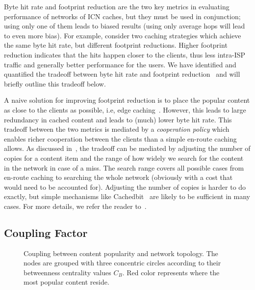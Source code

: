 \documentclass{sigcomm-alternate}
\begin{document}
Byte hit rate and footprint reduction are the two key metrics in evaluating performance of networks of ICN caches, but they must be used in conjunction; using only one of them leads to biased results (using only average hops will lead to even more bias).
For example, consider two caching strategies which achieve the same byte hit rate, but different footprint reductions.
Higher footprint reduction indicates that the hits happen closer to the clients, thus less intra-ISP traffic and generally better performance for the users.
We have identified and quantified the tradeoff between byte hit rate and footprint reduction~\cite{WangL:Cooperation} and will briefly outline this tradeoff below.

A naive solution for improving footprint reduction is to place the popular content as close to the clients as possible, i.e, edge caching~\cite{seyedicn2013}.
However, this leads to large redundancy in cached content and leads to (much) lower byte hit rate.
This tradeoff between the two metrics is mediated by a \emph{cooperation policy} which enables richer cooperation between the clients than a simple en-route caching allows.
As discussed in~\cite{WangL:Cooperation}, the tradeoff can be mediated by adjusting the number of copies for a content item and the range of how widely we search for the content in the network in case of a miss.
The search range covers all possible cases from en-route caching to searching the whole network (obviously with a cost that would need to be accounted for).
Adjusting the number of copies is harder to do exactly, but simple mechanisms like Cachedbit~\cite{wong:globecom2012} are likely to be sufficient in many cases.
For more details, we refer the reader to~\cite{WangL:Cooperation,wong:globecom2012}.















\subsection{Coupling Factor}
\label{sec:coupling-factor}

\begin{figure*}[!tb]
  \centering
  \quad
  \quad
  \caption{Coupling between content popularity and network topology. The nodes are grouped with three concentric circles according to their betweenness centrality values $C_B$. Red color represents where the most popular content reside.}
  \label{fig:coupling}
\end{figure*}
\end{document}
